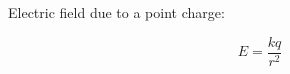 \documentclass{article}
\begin{document}
Electric field due to a point charge:

\[
E = \frac{kq}{r^2}
\]
\end{document}
